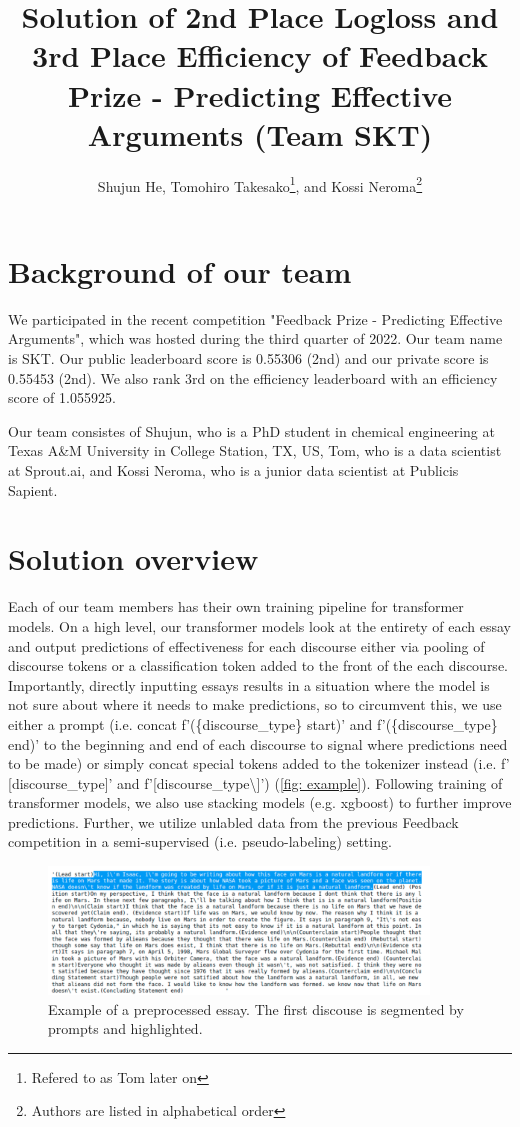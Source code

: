\documentclass[11pt]{article} %
\title{Solution of 2nd Place Logloss and 3rd Place Efficiency of Feedback Prize - Predicting Effective Arguments (Team SKT)}
\author{Shujun He, Tomohiro Takesako\footnote{Refered to as Tom later on}, and Kossi Neroma\footnote{Authors are listed in alphabetical order}}
\begin{document}
\maketitle

\section{Background of our team}

We participated in the recent competition "Feedback Prize - Predicting Effective Arguments", which was hosted during the third quarter of 2022. Our team name is SKT. Our public leaderboard score is 0.55306 (2nd) and our private score is 0.55453 (2nd). We also rank 3rd on the efficiency leaderboard with an efficiency score of 1.055925. 

Our team consistes of Shujun, who is a PhD student in chemical engineering at Texas A\&M University in College Station, TX, US, Tom, who is a data scientist at Sprout.ai, and Kossi Neroma, who is a junior data scientist at Publicis Sapient. 

\section{Solution overview}
Each of our team members has their own training pipeline for transformer models. On a high level, our transformer models look at the entirety of each essay and output predictions of effectiveness for each discourse either via pooling of discourse tokens or a classification token added to the front of the each discourse. Importantly, directly inputting essays results in a situation where the model is not sure about where it needs to make predictions, so to circumvent this, we use either a prompt (i.e. concat f'(\{discourse\_type\} start)' and f'(\{discourse\_type\} end)' to the beginning and end of each discourse to signal where predictions need to be made) or simply concat special tokens added to the tokenizer instead (i.e. f' [discourse\_type]' and f'[discourse\_type\textbackslash ]') (\autoref{fig: example}). Following training of transformer models, we also use stacking models (e.g. xgboost) to further improve predictions. Further, we utilize unlabled data from the previous Feedback competition in a semi-supervised (i.e. pseudo-labeling) setting. 

\begin{figure}[H]
\center
\includegraphics[width=0.9\textwidth]{graphics/example_segments.png}
\caption{Example of a preprocessed essay. The first discouse is segmented by prompts and highlighted. }
\label{fig: example}
\end{figure}
\end{document}
